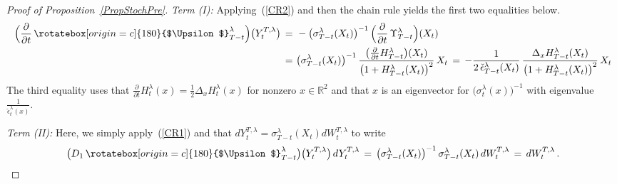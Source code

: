 \documentclass[10pt]{article}
\numberwithin{equation}{section}
\theoremstyle{definition}
\newcommand{\R}{{\mathbb R}}
\newcommand\rotUp{\rotatebox[origin=c]{180}{$\Upsilon$}}
\newcommand{\Rphi}{{\Upsilon}}
\newcommand{\Rvarphi}{{\rotUp}}
\begin{document}
\begin{appendix}
\begin{proof}[Proof of Proposition~\ref{PropStochPre}]
   \noindent \textit{Term (I):} Applying~(\ref{CR2}) and then the chain rule yields the first two equalities below. 
    \begin{align}\label{I1} 
    \Big(\frac{\partial}{\partial t}\,\Rvarphi_{T-t}^{\lambda}\Big)\big( Y^{T,\lambda}_t\big)\,=\,&\, -\big(\sigma_{T-t}^{\lambda}( X_t  )\big)^{-1} \,\Big(\frac{\partial}{\partial t}\,\Rphi_{T-t}^{\lambda}\Big)(X_t)\nonumber  \\ \,=\,&\,\big(\sigma_{T-t}^{\lambda}( X_t  )\big)^{-1}  \,\frac{ \big(\frac{ \partial }{\partial t }H_{T-t}^{\lambda}\big)(X_t)   }{ \big(1+H_{T-t}^{\lambda}(X_t) \big)^2 }\,  X_t  \,=\,- \frac{1}{2\, \check{\epsilon}_{T-t}^{\lambda}(X_t) }\, \frac{ \Delta_x  H_{T-t}^{\lambda}(X_t)   }{ \big(1+H_{T-t}^{\lambda}(X_t) \big)^2 } \, X_t  
    \end{align}
   The third equality uses that $\frac{\partial}{\partial t}H_{t}^{\lambda}(x)=\frac{1}{2} \Delta_x H_{t}^{\lambda}(x) $ for nonzero $x \in \R^2$ and that $x$ is an eigenvector for $\big(\sigma_{t}^{\lambda}(x)\big)^{-1}$ with eigenvalue $ \frac{1}{ \check{\epsilon}_{t}^{\lambda}(x) } $. \vspace{.3cm}
   
   
   
   \noindent \textit{Term (II):} Here, we simply apply~(\ref{CR1}) and that $dY^{T,\lambda}_t =\sigma_{T-t}^{\lambda}( X_t  ) dW^{T,\lambda}_t$ to write
    \begin{align}\label{I2}
    \big(D_1 \,\Rvarphi_{T-t}^{\lambda}\big)\big( Y^{T,\lambda}_t\big)\, dY^{T,\lambda}_t \,=\, \big(\sigma_{T-t}^{\lambda}( X_t  )\big)^{-1}\,\sigma_{T-t}^{\lambda}( X_t  )\, dW^{T,\lambda}_t\,=\,dW^{T,\lambda}_t \,. \vspace{.1cm}
    \end{align}
   
 
 

\end{proof}
\end{appendix}
\end{document}
